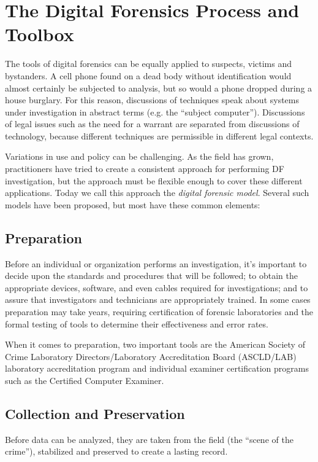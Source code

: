 \section{The Digital Forensics Process and Toolbox}

The tools of digital forensics can be equally applied to suspects,
victims and bystanders. A cell phone found on a dead body without
identification would almost certainly be subjected to analysis, but so
would a phone dropped during a house burglary. For this reason,
discussions of techniques speak about systems under investigation in
abstract terms (e.g. the ``subject computer''). Discussions of
legal issues such as the need for a warrant are separated from
discussions of technology, because different techniques are
permissible in different legal contexts.

Variations in use and policy can be challenging. As the field has
grown, practitioners have tried to create a consistent approach for
performing DF investigation, but the approach must be flexible enough
to cover these different applications. Today we call this approach the
\emph{digital forensic model}. Several such models have been
proposed\citep{pollitt:models}, but most have these common elements:


\subsection{Preparation} 
Before an individual or organization
  performs an investigation, it's important to decide upon the
  standards and procedures that will be followed; to obtain the
  appropriate devices, software, and even cables required for investigations; and to assure that
  investigators and technicians are appropriately trained. In some
  cases preparation may take years, requiring 
  certification of forensic laboratories and the formal testing of
  tools to determine their effectiveness and error rates. 

  When it comes to preparation, two important tools are the American Society of Crime Laboratory
  Directors/Laboratory Accreditation Board (ASCLD/LAB) laboratory
  accreditation program and individual examiner certification programs such as
  the Certified Computer Examiner.

\subsection{Collection and Preservation} 
Before data can be analyzed, they
  are taken from the field (the ``scene of the crime''),
  stabilized and preserved to create a lasting record. 

